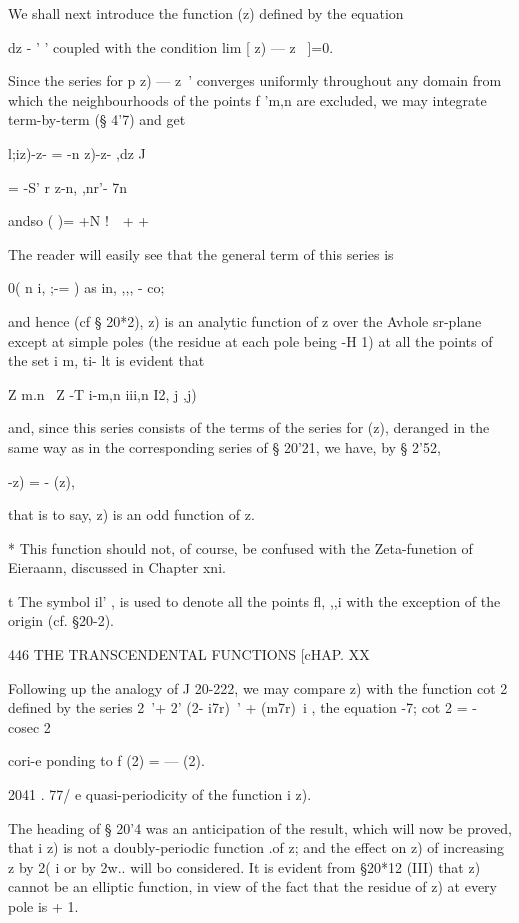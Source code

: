 {We shall next introduce the function (z) defined by the equation

dz - ' ' coupled with the condition lim [ z) — z~ ]=0.

Since the series for p z) — z~' converges uniformly throughout any
domain from which the neighbourhoods of the points f 'm,n are
excluded, we may integrate term-by-term (§ 4'7) and get

l;iz)-z- = -n z)-z- ,dz J

= -S' r z-n, ,nr'- 7n%

andso ( )= +N !\ \ + +

The reader will easily see that the general term of this series is

0( n i, ;-= ) as in, ,,, - co;

and hence (cf § 20*2), z) is an analytic function of z over the Avhole
sr-plane except at simple poles (the residue at each pole being -H 1)
at all the points of the set i m, ti- lt is evident that

Z m.n \ Z -T i-m,n iii,n I2, j ,j)

and, since this series consists of the terms of the series for (z),
deranged in the same way as in the corresponding series of § 20'21, we
have, by § 2'52,

  -z) = - (z),

that is to say, z) is an odd function of z.

* This function should not, of course, be confused with the
Zeta-funetion of Eieraann, discussed in Chapter xni.

t The symbol il' , is used to denote all the points fl, ,,i with the
exception of the origin (cf. §20-2).



446 THE TRANSCENDENTAL FUNCTIONS [cHAP. XX

Following up the analogy of J 20-222, we may compare z) with the
function cot 2 defined by the series 2~'+ 2' (2- i7r)~' + (m7r)~i ,
the equation -7; cot 2 = - cosec 2

cori-e ponding to f (2) = — (2).

2041 . 77/ e quasi-periodicity of the function i z).

The heading of § 20'4 was an anticipation of the result, which will
now be proved, that i z) is not a doubly-periodic function .of z; and
the effect on z) of increasing z by 2( i or by 2w.. will bo
considered. It is evident from §20*12 (III) that z) cannot be an
elliptic function, in view of the fact that the residue of z) at every
pole is + 1.

}
